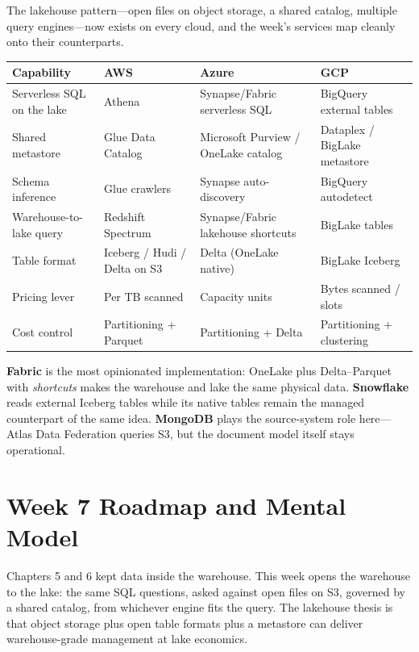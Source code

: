\begin{crosscloud}
The lakehouse pattern---open files on object storage, a shared catalog, multiple query engines---now exists on every cloud, and the week's services map cleanly onto their counterparts.

\vspace{2mm}
{\footnotesize
\begin{tabular}{@{}p{2.8cm}p{3.0cm}p{3.0cm}p{3.0cm}@{}}
\toprule
\textbf{Capability} & \textbf{AWS} & \textbf{Azure} & \textbf{GCP} \\
\midrule
Serverless SQL on the lake & Athena & Synapse/Fabric serverless SQL & BigQuery external tables \\
Shared metastore & Glue Data Catalog & Microsoft Purview / OneLake catalog & Dataplex / BigLake metastore \\
Schema inference & Glue crawlers & Synapse auto-discovery & BigQuery autodetect \\
Warehouse-to-lake query & Redshift Spectrum & Synapse/Fabric lakehouse shortcuts & BigLake tables \\
Table format & Iceberg / Hudi / Delta on S3 & Delta (OneLake native) & BigLake Iceberg \\
\addlinespace
Pricing lever & Per TB scanned & Capacity units & Bytes scanned / slots \\
Cost control & Partitioning + Parquet & Partitioning + Delta & Partitioning + clustering \\
\bottomrule
\end{tabular}}

\vspace{1mm}
\textbf{Fabric} is the most opinionated implementation: OneLake plus Delta--Parquet with \emph{shortcuts} makes the warehouse and lake the same physical data. \textbf{Snowflake} reads external Iceberg tables while its native tables remain the managed counterpart of the same idea. \textbf{MongoDB} plays the source-system role here---Atlas Data Federation queries S3, but the document model itself stays operational.
\end{crosscloud}

\section{Week 7 Roadmap and Mental Model}
Chapters 5 and 6 kept data inside the warehouse. This week opens the warehouse to the lake: the same SQL questions, asked against open files on S3, governed by a shared catalog, from whichever engine fits the query. The lakehouse thesis \cite{armbrust2021lakehouse} is that object storage plus open table formats plus a metastore can deliver warehouse-grade management at lake economics.

